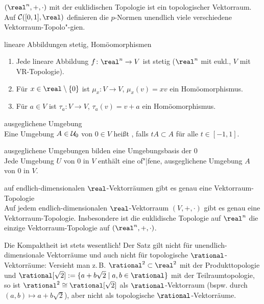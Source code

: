 \begin{Bsp}
    $(\real^n, +, \cdot)$ mit der euklidischen Topologie ist ein topologischer
    Vektorraum. \\
    Auf $\C([0, 1], \real)$ definieren die $p$-Normen unendlich viele
    verschiedene Vektorraum-Topolo"-gien.
\end{Bsp}

\begin{Satz}{lineare Abbildungen stetig, Homöomorphismen}
    \begin{enumerate}
        \item
        Jede lineare Abbildung $f\colon \real^n \rightarrow V$ ist stetig
        ($\real^n$ mit eukl., $V$ mit VR-Topologie).

        \item
        Für $x \in \real \setminus \{0\}$ ist $\mu_x\colon V \rightarrow V$,
        $\mu_x(v) = xv$ ein Homöomorphismus.

        \item
        Für $a \in V$ ist $\tau_a\colon V \rightarrow V$, $\tau_a(v) = v + a$
        ein Homöomorphismus.
    \end{enumerate}
\end{Satz}

\begin{Def}{ausgeglichene Umgebung}\\
    Eine Umgebung $A \in \mathcal{U}_0$ von $0 \in V$ heißt ,
    falls $tA \subset A$ für alle $t \in [-1, 1]$.
\end{Def}

\begin{Lemma}{ausgeglichene Umgebungen bilden eine Umgebungsbasis der $0$}\\
    Jede Umgebung $U$ von $0$ in $V$ enthält eine of"|fene,
    ausgeglichene Umgebung $A$ von $0$ in $V$.
\end{Lemma}

\begin{Satz}{auf endlich-dimensionalen $\real$-Vektorräumen gibt es genau
             eine Vektorraum-Topologie}\\
    Auf jedem endlich-dimensionalen $\real$-Vektorraum $(V, +, \cdot)$
    gibt es genau eine Vektorraum-Topo\-logie.
    Insbesondere ist die euklidische Topologie auf $\real^n$ die einzige
    Vektorraum-Topologie auf $(\real^n, +, \cdot)$.
\end{Satz}

\begin{Bem}
    Die Kompaktheit ist stets wesentlich!
    Der Satz gilt nicht für unendlich-dimensionale Vektorräume
    und auch nicht für topologische $\rational$-Vektorräume:
    Versieht man z.\,B. $\rational^2 \subset \real^2$ mit der Produkttopologie
    und $\rational[\sqrt{2}] := \{a + b\sqrt{2} \;|\; a, b \in \rational\}$
    mit der Teilraumtopologie, so ist $\rational^2 \cong \rational[\sqrt{2}]$
    als $\rational$-Vektorraum (bspw. durch $(a, b) \mapsto a + b \sqrt{2}$),
    aber nicht als topologische $\rational$-Vektorräume.
\end{Bem}

